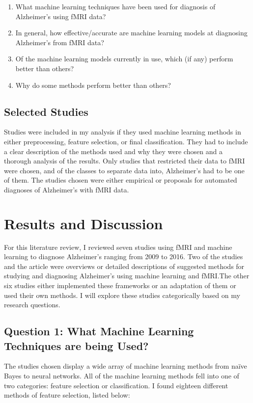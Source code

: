 \documentclass[pageno]{jpaper}
\begin{document}
\begin{enumerate}
    \item What machine learning techniques have been used for diagnosis of
    Alzheimer's using fMRI data?
    \item In general, how effective/accurate are machine learning models at
    diagnosing Alzheimer's from fMRI data?
    \item Of the machine learning models currently in use, which (if any) perform
    better than others?
    \item Why do some methods perform better than others?
\end{enumerate}

\subsection{Selected Studies}
\label{sub:Selected Studies}
Studies were included in my analysis if they used machine learning methods in
either preprocessing, feature selection, or final classification. They had to
include a clear description of the methods used and why they were chosen and
a thorough analysis of the results. Only studies that restricted their data to
fMRI were chosen, and of the classes to separate data into, Alzheimer's had to
be one of them. The studies chosen were either empirical or proposals for
automated diagnoses of Alzheimer's with fMRI data.

\section{Results and Discussion}
\label{sec:Results and Discussion}

For this literature review, I reviewed seven studies using fMRI and machine learning
to diagnose Alzheimer's ranging from 2009 to 2016. Two of the studies and the
article were overviews or detailed descriptions of suggested methods for studying
and diagnosing Alzheimer's using machine learning and fMRI.\@ The other six studies
either implemented these frameworks or an adaptation of them or used their own methods.
I will explore these studies categorically based on my research questions.

\subsection{Question 1: What Machine Learning Techniques are being Used?}
\label{sub:Question 1: What Machine Learning Techniques are being Used?}
The studies chosen display a wide array of machine learning methods from naïve
Bayes to neural networks. All of the machine learning methods fell into one of
two categories: feature selection or classification. I found eighteen different
methods of feature selection, listed below:
\end{document}
